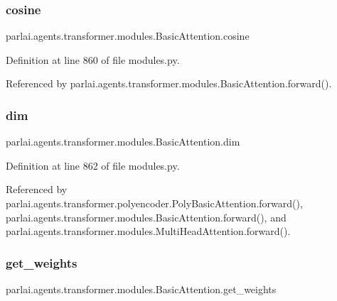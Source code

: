 \subsubsection{\texorpdfstring{cosine}{cosine}}
{\footnotesize\ttfamily parlai.\+agents.\+transformer.\+modules.\+Basic\+Attention.\+cosine}



Definition at line 860 of file modules.\+py.



Referenced by parlai.\+agents.\+transformer.\+modules.\+Basic\+Attention.\+forward().

\mbox{\label{classparlai_1_1agents_1_1transformer_1_1modules_1_1BasicAttention_ad0beb8f8b3e4514139b08555cf739d55}} 
\subsubsection{\texorpdfstring{dim}{dim}}
{\footnotesize\ttfamily parlai.\+agents.\+transformer.\+modules.\+Basic\+Attention.\+dim}



Definition at line 862 of file modules.\+py.



Referenced by parlai.\+agents.\+transformer.\+polyencoder.\+Poly\+Basic\+Attention.\+forward(), parlai.\+agents.\+transformer.\+modules.\+Basic\+Attention.\+forward(), and parlai.\+agents.\+transformer.\+modules.\+Multi\+Head\+Attention.\+forward().

\mbox{\label{classparlai_1_1agents_1_1transformer_1_1modules_1_1BasicAttention_a98d54b38fac0a88d46eba7adf6ac542c}} 
\subsubsection{\texorpdfstring{get\+\_\+weights}{get\_weights}}
{\footnotesize\ttfamily parlai.\+agents.\+transformer.\+modules.\+Basic\+Attention.\+get\+\_\+weights}



